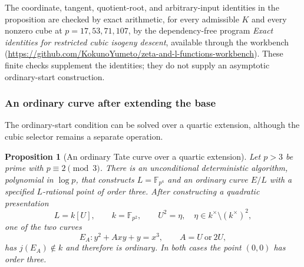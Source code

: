 \documentclass[11pt]{article}
\newcommand{\workbenchurl}{https://github.com/KokunoYumeto/zeta-and-l-functions-workbench}
\newtheorem{proposition}[theorem]{Proposition}
\theoremstyle{definition}
\theoremstyle{remark}
\begin{document}
The coordinate, tangent, quotient-root, and arbitrary-input
identities in the proposition are checked by exact arithmetic,
for every admissible $K$ and every nonzero cube at
$p=17,53,71,107$, by the dependency-free program
\emph{Exact identities for restricted cubic isogeny descent}, available through the workbench (\url{\workbenchurl}).  These finite checks
supplement the identities; they do not supply an asymptotic
ordinary-start construction.

\subsubsection{An ordinary curve after extending the base}
The ordinary-start condition can be solved over a quartic extension, although the cubic selector remains a separate operation.


\begin{proposition}[An ordinary Tate curve over a quartic extension]
\label{prop:ordinary-quartic-start}
Let $p>3$ be prime with $p\equiv2\pmod3$.
There is an unconditional deterministic algorithm, polynomial in
$\log p$, that constructs $L=\mathbb F_{p^4}$ and an ordinary
curve $E/L$ with a specified $L$-rational point of order three.
After constructing a quadratic presentation
\[
 L=k[U],\qquad k=\mathbb F_{p^2},\qquad U^2=\eta,
 \quad \eta\in k^\times\setminus(k^\times)^2,
\]
one of the two curves
\[
 E_A:y^2+Axy+y=x^3,\qquad A=U\ \text{or}\ 2U,
\]
has $j(E_A)\notin k$ and therefore is ordinary.  In both cases
the point $(0,0)$ has order three.
\end{proposition}
\end{document}
